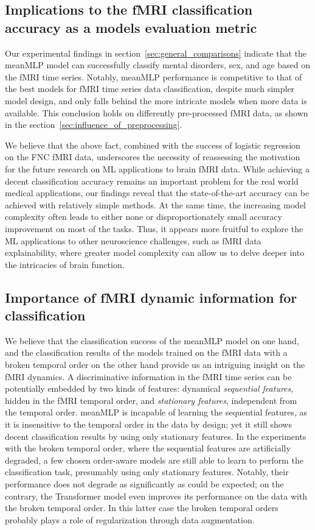 \documentclass[final,5p,times,twocolumn,authoryear]{elsarticle}
\begin{document}
\subsection{Implications to the fMRI classification accuracy as a models evaluation metric}
Our experimental findings in section~\ref{sec:general_comparisons} indicate that the meanMLP model can successfully classify mental disorders, sex, and age based on the fMRI time series. Notably, meanMLP performance is competitive to that of the best models for fMRI time series data classification, despite much simpler model design, and only falls behind the more intricate models when more data is available. This conclusion holds on differently pre-processed fMRI data, as shown in the section~\ref{sec:influence_of_preprocessing}.

We believe that the above fact, combined with the success of logistic regression on the FNC fMRI data, underscores the necessity of reassessing the motivation for the future research on ML applications to brain fMRI data. While achieving a decent classification accuracy remains an important problem for the real world medical applications, our findings reveal that the state-of-the-art accuracy can be achieved with relatively simple methods. At the same time, the increasing model complexity often leads to either none or disproportionately small accuracy improvement on most of the tasks. Thus, it appears more fruitful to explore the ML applications to other neuroscience challenges, such as fMRI data explainability, where greater model complexity can allow us to delve deeper into the intricacies of brain function.

\subsection{Importance of fMRI dynamic information for classification}
We believe that the classification success of the meanMLP model on one hand, and the classification results of the models trained on the fMRI data with a broken temporal order on the other hand provide us an intriguing insight on the fMRI dynamics. A discriminative information in the fMRI time series can be potentially embedded by two kinds of features: dynamical \emph{sequential features}, hidden in the fMRI temporal order, and \emph{stationary features}, independent from the temporal order. meanMLP is incapable of learning the sequential features, as it is insensitive to the temporal order in the data by design; yet it still shows decent classification results by using only stationary features. In the experiments with the broken temporal order, where the sequential features are artificially degraded, a few chosen order-aware models are still able to learn to perform the classification task, presumably using only stationary features. Notably, their performance does not degrade as significantly as could be expected; on the contrary, the Transformer model even improves its performance on the data with the broken temporal order. In this latter case the broken temporal orders probably plays a role of regularization through data augmentation.
\end{document}
